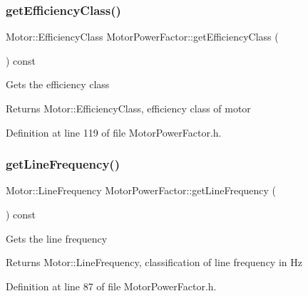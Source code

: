 \mbox{\label{class_motor_power_factor_a1ce98cb6ae9fbf09b05b4b6bd75e5c71}} 
\subsubsection{\texorpdfstring{get\+Efficiency\+Class()}{getEfficiencyClass()}}
{\footnotesize\ttfamily Motor\+::\+Efficiency\+Class Motor\+Power\+Factor\+::get\+Efficiency\+Class (\begin{DoxyParamCaption}{ }\end{DoxyParamCaption}) const\hspace{0.3cm}{\ttfamily [inline]}}

Gets the efficiency class \begin{DoxyReturn}{Returns}
Motor\+::\+Efficiency\+Class, efficiency class of motor 
\end{DoxyReturn}


Definition at line 119 of file Motor\+Power\+Factor.\+h.

\mbox{\label{class_motor_power_factor_aa4cdc420b1f611bcb9f4a69c69c1fabf}} 
\subsubsection{\texorpdfstring{get\+Line\+Frequency()}{getLineFrequency()}}
{\footnotesize\ttfamily Motor\+::\+Line\+Frequency Motor\+Power\+Factor\+::get\+Line\+Frequency (\begin{DoxyParamCaption}{ }\end{DoxyParamCaption}) const\hspace{0.3cm}{\ttfamily [inline]}}

Gets the line frequency \begin{DoxyReturn}{Returns}
Motor\+::\+Line\+Frequency, classification of line frequency in Hz 
\end{DoxyReturn}


Definition at line 87 of file Motor\+Power\+Factor.\+h.

\mbox{\label{class_motor_power_factor_acc7e144fc6c05446141cb0e07be03d70}} 
